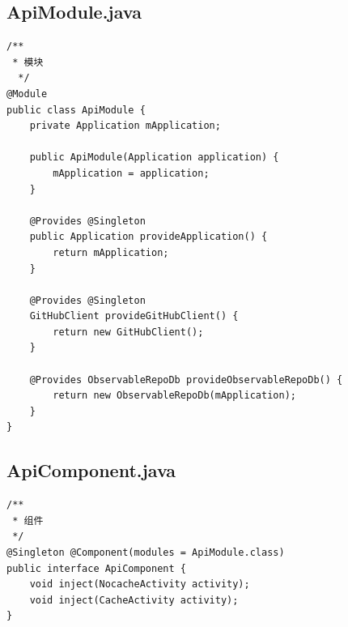 \documentclass[9pt, b5paper]{article}
\begin{document}
\subsection{ApiModule.java}
\label{sec-6-2}
\begin{verbatim}
/**
 * 模块
  */
@Module
public class ApiModule {
    private Application mApplication;

    public ApiModule(Application application) {
        mApplication = application;
    }

    @Provides @Singleton
    public Application provideApplication() {
        return mApplication;
    }

    @Provides @Singleton
    GitHubClient provideGitHubClient() {
        return new GitHubClient();
    }

    @Provides ObservableRepoDb provideObservableRepoDb() {
        return new ObservableRepoDb(mApplication);
    }
}
\end{verbatim}
\subsection{ApiComponent.java}
\label{sec-6-3}
\begin{verbatim}
/**
 * 组件
 */
@Singleton @Component(modules = ApiModule.class)
public interface ApiComponent {
    void inject(NocacheActivity activity);
    void inject(CacheActivity activity);
}
\end{verbatim}
\end{document}
